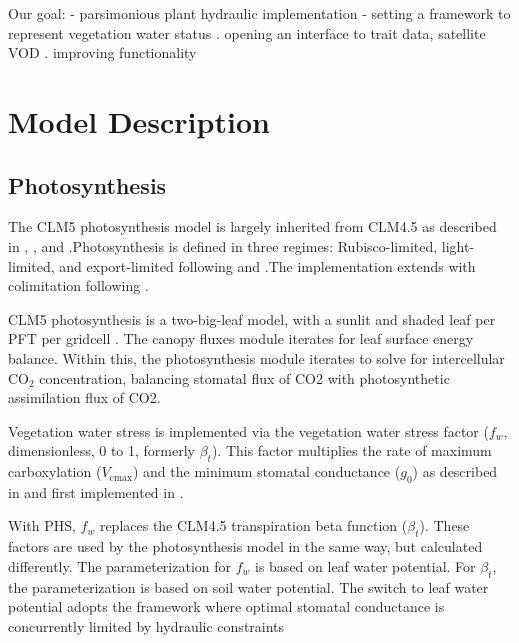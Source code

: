 \documentclass[draft,linenumbers]{agujournal}
\begin{document}
Our goal:
  - parsimonious plant hydraulic implementation
  - setting a framework to represent vegetation water status
       . opening an interface to trait data, satellite VOD \citep{momen2017}
       . improving functionality

\section{Model Description}

\subsection{Photosynthesis}
\label{sect:A}
    The CLM5 photosynthesis model is largely inherited from CLM4.5 as described in \citet{bonan2011}, \citet{thornton2007},
    and \citet{oleson2013}.Photosynthesis is defined in three regimes: Rubisco-limited, light-limited, and export-limited 
    following \citet{farquhar1980} and \citet{harley1992}.The implementation extends \citet{sellers1996a,sellers1996b} with 
    colimitation following \citet{collatz1991}. 
    
    CLM5 photosynthesis is a two-big-leaf model, with a sunlit and shaded leaf per PFT per gridcell \citep{thornton2007, 
    dai2004, oleson2013}. The canopy fluxes module iterates for leaf surface energy balance.
    Within this, the photosynthesis module iterates to solve for intercellular CO$_2$ concentration, balancing stomatal flux of 
    CO2 with photosynthetic assimilation flux of CO2.
    
    Vegetation water stress is implemented via the vegetation water stress factor ($f_w$, dimensionless, 0 to 1, formerly 
    $\beta_t$). This factor multiplies the rate of maximum carboxylation ($V_{\text{cmax}}$) and the minimum stomatal 
    conductance ($g_0$) as described in \citet{oleson2013} and first implemented in \citet{sellers1996a,sellers1996b}. 
    
    With PHS, $f_w$ replaces the CLM4.5 transpiration beta function ($\beta_t$). 
    These factors are used by the photosynthesis model in the same way, but calculated differently. 
    The parameterization for $f_w$ is based on leaf water potential. 
    For $\beta_t$, the parameterization is based on soil water potential.
    The switch to leaf water potential adopts the framework where optimal stomatal conductance is concurrently limited by hydraulic constraints \citep{novick2016a}
\end{document}
